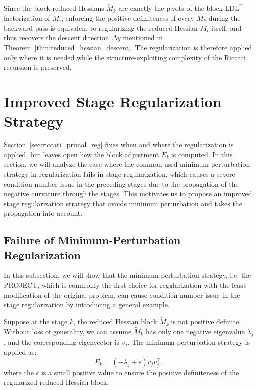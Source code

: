 \documentclass[class=scrbook, crop=false]{standalone}
\begin{document}
Since the block reduced Hessians $\tilde{M}_k$ are exactly the pivots of
the block $\mathrm{LD}\mathrm{L}^\top$ factorization of $\tilde{M}_i$,
enforcing the positive definiteness of every $\tilde{M}_k$ during the backward pass is equivalent to regularizing the reduced Hessian $\tilde{M}_i$ itself, 
and thus recovers the descent direction $\Delta y$ mentioned in Theorem~\ref{thm:reduced_hessian_descent}.
The regularization is therefore applied only where it is needed while the structure-exploiting complexity of the Riccati recursion is preserved.

\section{Improved Stage Regularization Strategy}
\label{sec:fail_minimal_perturbation}
Section~\ref{sec:riccati_primal_reg} fixes when and where the regularization is applied,
but leaves open how the block adjustment $E_k$ is computed.
In this section, we will analyze the case 
where the common-used minimum perturbation strategy in regularization fails in stage regularization,
which causes a severe condition number issue in the preceding stages due to the propagation of the negative curvature through the stages.
This motivates us to propose an improved stage regularization strategy that avoids minimum perturbation and takes the propagation into account.

\subsection{Failure of Minimum-Perturbation Regularization}
In this subsection, we will show that the minimum perturbation strategy, i.e. the PROJECT, 
which is commonly the first choice for regularization with the least modification of the original problem, 
can cause condition number issue in the stage regularization by introducing a general example.

Suppose at the stage $k$, the reduced Hessian block $\tilde{M}_k$ is not positive definite.
Without loss of generality, we can assume $\tilde{M}_k$ has only one negative eigenvalue $\lambda_j$, and the corresponding eigenvector is $v_j$.
The minimum perturbation strategy is applied as:
\begin{equation}
    E_k = (-\lambda_{j}+\epsilon) v_j v_j^\top,
\end{equation}
where the $\epsilon$ is a small positive value to ensure the positive definiteness of the regularized reduced Hessian block. 
\end{document}
